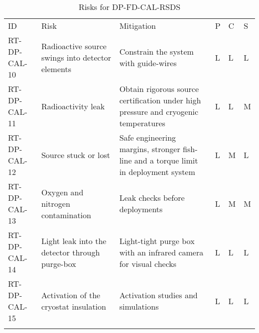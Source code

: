 
\begin{longtable}{p{}p{}p{}p{}p{}p{}} 
\caption{Risks for DP-FD-CAL-RSDS } \\
\rowcolor{dunesky}
ID & Risk & Mitigation & P & C & S  \\  \colhline
RT-DP-CAL-10 & Radioactive source swings into detector elements & Constrain the system with guide-wires & L & L & L \\  \colhline
RT-DP-CAL-11 & Radioactivity leak & Obtain rigorous source certification under high pressure and cryogenic temperatures & L & L & M \\  \colhline
RT-DP-CAL-12 & Source stuck or lost & Safe engineering margins, stronger fish-line and a torque limit in deployment system & L & M & L \\  \colhline
RT-DP-CAL-13 & Oxygen and nitrogen contamination & Leak checks before deployments & L & M & M \\  \colhline
RT-DP-CAL-14 & Light leak into the detector through purge-box & Light-tight purge box with an infrared camera for visual checks & L & L & L \\  \colhline
RT-DP-CAL-15 & Activation of the cryostat insulation & Activation studies and simulations & L & L & L \\  \colhline

\label{tab:risks:DP-FD-CAL-RSDS}
\end{longtable}
